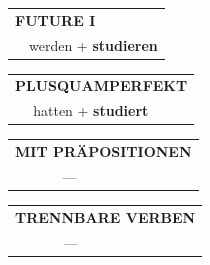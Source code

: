 \documentclass[10pt,a4paper]{revtex4-2}
\begin{document}
\begin{verbbox}
\begin{tabular}{rl}
    \multicolumn{2}{l}{\textbf{FUTURE I} }\\
   & werden + \textbf{studieren}\\
 
  \end{tabular}
\hfill
   \begin{tabular}{rl}
      \multicolumn{2}{l}{\textbf{PLUSQUAMPERFEKT}}\\
   & hatten + \textbf{studiert}\\
  \end{tabular}
  
  \vspace{10pt}

\begin{tabular}{lll}
\multicolumn{3}{l}{\textbf{MIT PRÄPOSITIONEN}}\\
& ---\\
\end{tabular}
\hfill
\begin{tabular}{lll}
\multicolumn{3}{l}{\textbf{TRENNBARE VERBEN}}\\
& ---\\
\end{tabular}

  \vspace{-5pt}

\end{verbbox}
\end{document}

